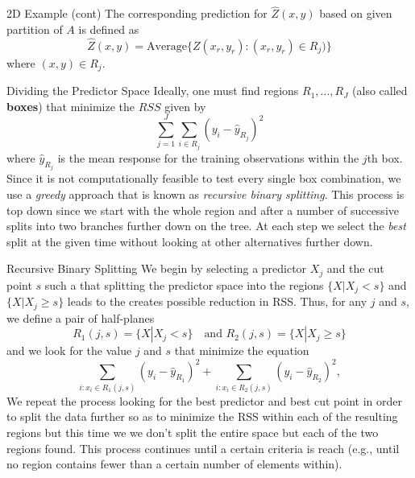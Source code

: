 \documentclass{beamer}
\begin{document}
\begin{frame}{2D Example (cont)}
The corresponding prediction for $\widehat{Z}(x,y)$ based on given partition of $A$ is defined as 
\begin{equation*}
	\widehat{Z}(x,y)= \textrm{Average} \{ Z(x_r,y_r)\colon (x_r ,y_r)\in R_j)\}
\end{equation*}
where $(x,y) \in R_j$.

\end{frame}

\begin{frame}{Dividing the Predictor Space}
	Ideally, one must find regions $R_1, \ldots, R_J$ (also called {\bf boxes}) that minimize the $RSS$ given by 
	\begin{equation*}
		\sum_{j=1}^J \sum_{i\in R_j} (y_i - \hat{y}_{R_j})^2
	\end{equation*}
where $\hat{y}_{R_j}$ is the mean response for the training observations within the $j$th box. Since it is not computationally feasible to test every single box combination, we use a {\it greedy} approach that is known as {\it recursive binary splitting}. This process is top down since we start with the whole region and after a number of successive splits into two branches further down on the tree. At each step we select the {\it best} split at the given time without looking at other alternatives further down. 
\end{frame}

\begin{frame}{Recursive Binary Splitting}
	We begin by selecting a predictor $X_j$ and the cut point $s$ such a that splitting the predictor space into the regions $\{ X| X_j <s \}$ and $\{ X | X_j \ge s\}$ leads to the creates possible reduction in RSS. Thus, for any $j$ and $s$, we define a pair of half-planes
	\begin{equation}
		R_1(j,s)= \{ X | X_j <s\} \quad \textrm{and } R_2(j,s)= \{X| X_j\ge s\}
		\label{eq:rbs1}
	\end{equation}
and we look for the value $j$ and $s$ that minimize the equation
\begin{equation}
	\sum_{i: x_i \in R_1(j,s)} (y_i - \hat{y}_{R_1})^2 + 	\sum_{i: x_i \in R_2(j,s)} (y_i - \hat{y}_{R_2})^2 ,
	\label{eq:rbs2}
\end{equation}
We repeat the process looking for the best predictor and best cut point in order to split the data further so as to minimize the RSS within each of the resulting regions but this time we we don't split the entire space but each of the two regions found. This process continues until a certain criteria is reach (e.g., until no region contains fewer than a certain number of elements within). 


\end{frame}
\end{document}
